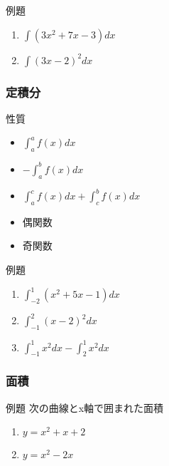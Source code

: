 \documentclass[10pt,dvipdfmx]{jsarticle}
\begin{document}
\begin{itembox}[l]{例題}
  \begin{large}
    \begin{enumerate}
      \item $\int (3x^2+7x-3) dx$
      \item $\int (3x-2)^2dx$
    \end{enumerate}
  \end{large}
\end{itembox}

\subsubsection*{定積分}
性質
\begin{multicols}{2}
  \begin{Large}
    \begin{itemize}
      \item $\int_{a}^{a}f(x)dx$
      \item $-\int_{a}^{b}f(x)dx$
      \item $\int_{a}^{c}f(x)dx+\int_{c}^{b}f(x)dx$
      \item 偶関数
      \item 奇関数
    \end{itemize}
  \end{Large}
\end{multicols}

\begin{itembox}[l]{例題}
  \begin{large}
    \begin{enumerate}
      \item $\int_{-2}^{1}(x^2+5x-1)dx$
      \item $\int_{-1}^{2}(x-2)^2dx$
      \item $\int_{-1}^{1}x^2dx-\int_{2}^{1}x^2dx$
    \end{enumerate}
  \end{large}
\end{itembox}


\subsubsection*{面積}
\begin{itembox}[l]{例題}
  次の曲線とx軸で囲まれた面積
  \begin{large}
    \begin{enumerate}
      \item $y=x^2+x+2$
      \item $y=x^2-2x$
    \end{enumerate}
  \end{large}
\end{itembox}
\end{document}
